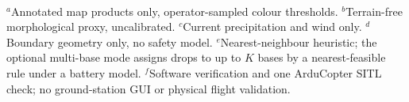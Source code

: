 \begin{table}[t]
{\begin{tabular}{@{}p{4.9cm}cccccccc@{}}
\bottomrule
\end{tabular}}\\[2pt]
\parbox{\textwidth}{\scriptsize $^{a}$Annotated map products only, operator-sampled colour thresholds. $^{b}$Terrain-free morphological proxy, uncalibrated. $^{c}$Current precipitation and wind only. $^{d}$Boundary geometry only, no safety model. $^{e}$Nearest-neighbour heuristic; the optional multi-base mode assigns drops to up to $K$ bases by a nearest-feasible rule under a battery model. $^{f}$Software verification and one ArduCopter SITL check; no ground-station GUI or physical flight validation.}
\end{table}
